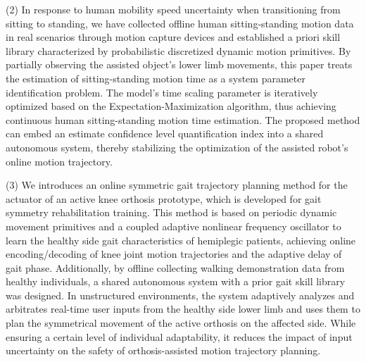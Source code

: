 \begin{abstract*}
(2) In response to human mobility speed uncertainty when transitioning from sitting to standing, we have collected offline human sitting-standing motion data in real scenarios through motion capture devices and established a priori skill library characterized by probabilistic discretized dynamic motion primitives. By partially observing the assisted object's lower limb movements, this paper treats the estimation of sitting-standing motion time as a system parameter identification problem. The model's time scaling parameter is iteratively optimized based on the Expectation-Maximization algorithm, thus achieving continuous human sitting-standing motion time estimation. The proposed method can embed an estimate confidence level quantification index into a shared autonomous system, thereby stabilizing the optimization of the assisted robot's online motion trajectory.

(3) We introduces an online symmetric gait trajectory planning method for the actuator of an active knee orthosis prototype, which is developed for gait symmetry rehabilitation training. This method is based on periodic dynamic movement primitives and a coupled adaptive nonlinear frequency oscillator to learn the healthy side gait characteristics of hemiplegic patients, achieving online encoding/decoding of knee joint motion trajectories and the adaptive delay of gait phase. Additionally, by offline collecting walking demonstration data from healthy individuals, a shared autonomous system with a prior gait skill library was designed. In unstructured environments, the system adaptively analyzes and arbitrates real-time user inputs from the healthy side lower limb and uses them to plan the symmetrical movement of the active orthosis on the affected side. While ensuring a certain level of individual adaptability, it reduces the impact of input uncertainty on the safety of orthosis-assisted motion trajectory planning.
\end{abstract*}
